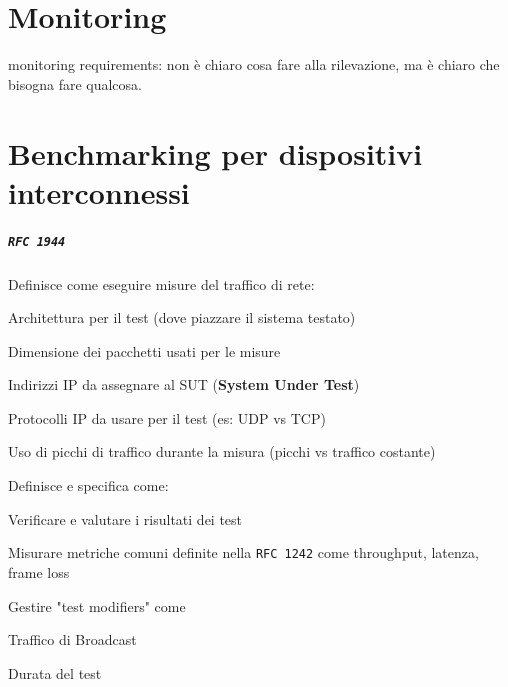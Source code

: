 \documentclass[10pt]{book}
\begin{document}
\chapter{Monitoring}
monitoring requirements: non è chiaro cosa fare alla rilevazione, ma è chiaro che bisogna fare qualcosa.
\chapter{Benchmarking per dispositivi interconnessi}
\paragraph{\texttt{RFC 1944}} Definisce come eseguire misure del traffico di rete:
\begin{list}{-}{}
	\item Architettura per il test (dove piazzare il sistema testato)
	\item Dimensione dei pacchetti usati per le misure
	\item Indirizzi IP da assegnare al SUT (\textbf{System Under Test})
	\item Protocolli IP da usare per il test (es: UDP vs TCP)
	\item Uso di picchi di traffico durante la misura (picchi vs traffico costante)
\end{list}
Definisce e specifica come:
\begin{list}{-}{}
	\item Verificare e valutare i risultati dei test
	\item Misurare metriche comuni definite nella \texttt{RFC 1242} come throughput, latenza, frame loss
	\item Gestire "test modifiers" come
	\begin{list}{-}{}
		\item Traffico di Broadcast
		\item Durata del test
	\end{list}
\end{list}
\end{document}

